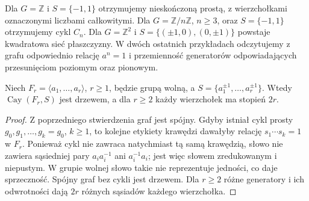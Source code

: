 \begin{przyklad}
Dla $G=\mathbb Z$ i $S=\{-1,1\}$ otrzymujemy
nieskończoną prostą, z wierzchołkami oznaczonymi liczbami całkowitymi.
Dla $G=\mathbb Z/n\mathbb Z$, $n\ge3$, oraz $S=\{-1,1\}$
otrzymujemy cykl $C_n$. Dla $G=\mathbb Z^2$ i
$S=\{(\pm1,0),(0,\pm1)\}$ powstaje kwadratowa sieć
płaszczyzny. W dwóch ostatnich przykładach odczytujemy
z grafu odpowiednio relację $a^n=1$ i przemienność
generatorów odpowiadających przesunięciom poziomym
oraz pionowym.
\end{przyklad}

\begin{center}
\end{center}

\begin{twierdzenie}
Niech $F_r=\langle a_1,\ldots,a_r\rangle$, $r\ge1$,
będzie grupą wolną, a $S=\{a_1^{\pm1},\ldots,a_r^{\pm1}\}$.
Wtedy $\operatorname{Cay}(F_r,S)$ jest drzewem,
a dla $r\ge2$ każdy wierzchołek ma stopień $2r$.
\end{twierdzenie}
\begin{proof}
Z poprzedniego stwierdzenia graf jest spójny. Gdyby istniał
cykl prosty $g_0,g_1,\ldots,g_k=g_0$, $k\ge1$, to
kolejne etykiety krawędzi dawałyby relację
$s_1\cdots s_k=1$ w $F_r$. Ponieważ cykl nie zawraca
natychmiast tą samą krawędzią, słowo nie zawiera sąsiedniej
pary $a_i a_i^{-1}$ ani $a_i^{-1}a_i$; jest więc słowem
zredukowanym i niepustym. W grupie wolnej słowo takie
nie reprezentuje jedności, co daje sprzeczność.
Spójny graf bez cykli jest drzewem. Dla $r\ge2$
różne generatory i ich odwrotności dają $2r$
różnych sąsiadów każdego wierzchołka.
\end{proof}

